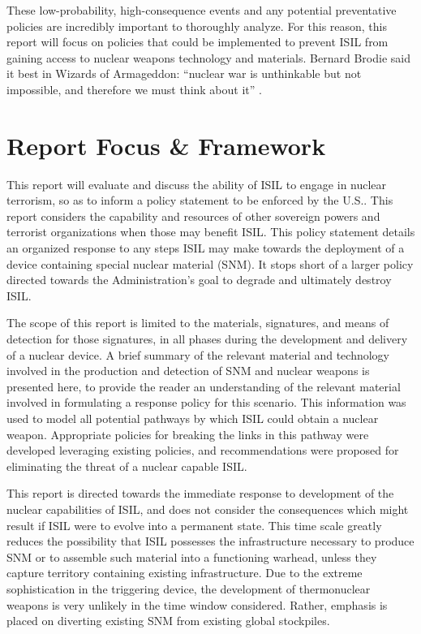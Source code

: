 \documentclass{report}
\begin{document}
These low-probability, high-consequence events and any potential preventative policies are incredibly important to thoroughly analyze. For this reason, this report will focus on policies that could be implemented to prevent ISIL from gaining access to nuclear weapons technology and materials. Bernard Brodie said it best in Wizards of Armageddon: \enquote{nuclear war is unthinkable but not impossible, and therefore we must think about it} \cite{kaplan1991wizards}.





\section{Report Focus \& Framework}

This  report will evaluate and discuss the ability of  ISIL to engage in nuclear terrorism, so as to inform a policy statement to be enforced by the U.S.. This report considers the capability and resources of other sovereign powers and terrorist organizations when those may benefit ISIL. This policy statement details an organized response to any steps ISIL may make towards the deployment of a device containing special nuclear material (SNM). It stops short of a larger policy directed towards  the Administration's goal to degrade and ultimately destroy ISIL. 

The scope of this  report is limited to the materials, signatures, and means of detection for those signatures, in all phases during the development and delivery of a nuclear device. A brief summary of the relevant material and technology involved in the production and detection of SNM and nuclear weapons is presented here, to provide the reader an understanding of the relevant material involved in formulating a response policy for this scenario. This information was used to model all potential pathways by which ISIL could obtain a nuclear weapon. Appropriate policies for breaking the links in this pathway were developed leveraging existing policies, and recommendations were proposed for eliminating the threat of a nuclear capable ISIL.

This  report is directed towards the immediate response to development of the nuclear capabilities of ISIL, and does not consider the consequences which might result if ISIL were to evolve into a permanent state. This  time scale greatly reduces the possibility that ISIL possesses the infrastructure necessary to produce SNM or to assemble such material into a functioning warhead, unless they capture territory containing existing infrastructure. Due to the extreme sophistication in the triggering device, the development of thermonuclear weapons is very unlikely in the time window considered. Rather, emphasis is placed on diverting existing SNM from existing global stockpiles.
\end{document}

